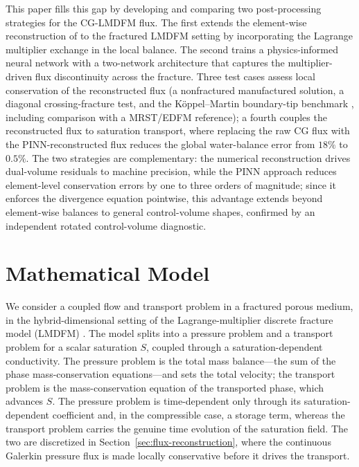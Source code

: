 \documentclass[a4paper,fleqn]{cas-sc}
\begin{document}
This paper fills this gap by developing and comparing two post-processing strategies for the CG-LMDFM
flux. The first extends the element-wise reconstruction of \citet{DENG2019166} to the fractured LMDFM
setting by incorporating the Lagrange multiplier exchange in the local balance. The second trains a
physics-informed neural network with a two-network architecture that captures the multiplier-driven flux
discontinuity across the fracture. Three test cases assess local conservation of the reconstructed flux (a nonfractured manufactured
solution, a diagonal crossing-fracture test, and the K\"{o}ppel--Martin boundary-tip benchmark
\citep{Koeppel2019}, including comparison with a MRST/EDFM reference); a fourth couples the reconstructed flux to saturation transport, where replacing the raw CG flux with the PINN-reconstructed flux reduces the global water-balance error from \(18\%\) to \(0.5\%\).
The two strategies are complementary: the numerical reconstruction drives dual-volume residuals to machine
precision, while the PINN approach reduces element-level conservation errors by one to three orders of magnitude;
since it enforces the divergence equation pointwise, this advantage extends beyond element-wise balances
to general control-volume shapes, confirmed by an independent rotated control-volume diagnostic.


\section{Mathematical Model}
\label{sec:model-diagnostics}

We consider a coupled flow and transport problem in a fractured porous medium, in
the hybrid-dimensional setting of the Lagrange-multiplier discrete fracture model
(LMDFM) \citep{Koeppel2019}. The model splits into a pressure problem and a
transport problem for a scalar saturation \(S\), coupled through a
saturation-dependent conductivity. The pressure problem is the total mass
balance---the sum of the phase mass-conservation equations---and sets the total
velocity; the transport problem is the mass-conservation equation of the
transported phase, which advances \(S\). The pressure problem is time-dependent
only through its saturation-dependent coefficient and, in the compressible case,
a storage term, whereas the transport problem carries the genuine time evolution
of the saturation field.
The two are discretized in Section~\ref{sec:flux-reconstruction}, where the
continuous
Galerkin pressure flux is made locally conservative before it drives the
transport.
\end{document}
